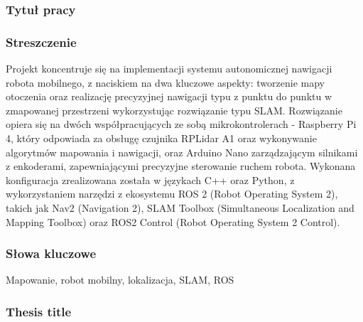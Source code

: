 \documentclass[a4paper,twoside,12pt]{book}
\begin{document}


\cleardoublepage

\rmfamily\normalfont
\pagestyle{empty}


\subsubsection*{Tytuł pracy} 
\Title
\subsubsection*{Streszczenie}  
Projekt koncentruje się na implementacji systemu autonomicznej nawigacji robota mobilnego, z naciskiem na dwa kluczowe aspekty: tworzenie mapy otoczenia oraz realizację precyzyjnej nawigacji typu z punktu do punktu w zmapowanej przestrzeni wykorzystując rozwiązanie typu SLAM. Rozwiązanie opiera się na dwóch współpracujących ze sobą mikrokontrolerach - Raspberry Pi 4, który odpowiada za obsługę czujnika RPLidar A1 oraz wykonywanie algorytmów mapowania i nawigacji, oraz Arduino Nano zarządzającym silnikami z enkoderami, zapewniającymi precyzyjne sterowanie ruchem robota. Wykonana konfiguracja zrealizowana została w językach C++ oraz Python, z wykorzystaniem narzędzi z ekosystemu ROS 2 (Robot Operating System 2), takich jak Nav2 (Navigation 2), SLAM Toolbox (Simultaneous Localization and Mapping Toolbox) oraz ROS2 Control (Robot Operating System 2 Control).


\subsubsection*{Słowa kluczowe} 
Mapowanie, robot mobilny, lokalizacja, SLAM, ROS
\subsubsection*{Thesis title} 
\begin{otherlanguage}{british}
\TitleAlt
\end{otherlanguage}
\end{document}
